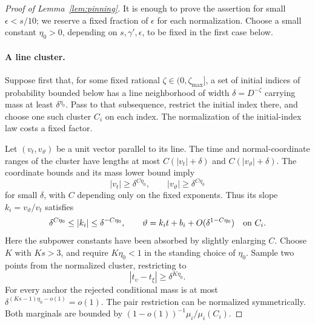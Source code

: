 \begin{proof}[Proof of Lemma~\ref{lem:pinning}]
It is enough to prove the assertion for small $\epsilon<s/10$;
we reserve a fixed fraction of $\epsilon$ for each normalization.
Choose a small constant $\eta_0>0$, depending on
$s,\gamma',\epsilon$, to be fixed in the first case below.

\paragraph{A line cluster.}
Suppose first that, for some fixed rational
$\zeta\in(0,\zeta_{\max}]$, a set of initial indices of probability
bounded below has a line neighborhood of width
$\delta=D^{-\zeta}$ carrying mass at least $\delta^{\eta_0}$.
Pass to that subsequence, restrict the initial index there, and
choose one such cluster $C_i$ on each index.
The normalization of the initial-index law costs a fixed factor.

Let $(v_t,v_\vartheta)$ be a unit vector parallel to its line.
The time and normal-coordinate ranges of the cluster have lengths
at most $C(|v_t|+\delta)$ and $C(|v_\vartheta|+\delta)$.
The coordinate bounds and its mass lower bound imply
\[
 |v_t|\ge\delta^{C\eta_0},\qquad
 |v_\vartheta|\ge\delta^{C\eta_0}
\]
for small $\delta$, with $C$ depending only on the fixed exponents.
Thus its slope $k_i=v_\vartheta/v_t$ satisfies
\begin{equation}
 \delta^{C\eta_0}\le |k_i|\le\delta^{-C\eta_0},
 \qquad
 \vartheta=k_i t+b_i+O(\delta^{1-C\eta_0})
 \quad\hbox{on }C_i.
\label{pr:cluster-slope}
\end{equation}
Here the subpower constants have been absorbed by slightly enlarging
$C$. Choose $K$ with $Ks>3$, and require $K\eta_0<1$ in the standing
choice of $\eta_0$. Sample two points from the normalized
cluster, restricting to
\[
 |t_\upsilon-t_\xi|\ge\delta^{K\eta_0}.
\]
For every anchor the rejected conditional mass is at most
$\delta^{(Ks-1)\eta_0-o(1)}=o(1)$.
The pair restriction can be normalized symmetrically.
Both marginals are bounded by
$(1-o(1))^{-1}\mu_i/\mu_i(C_i)$.


\end{proof}
